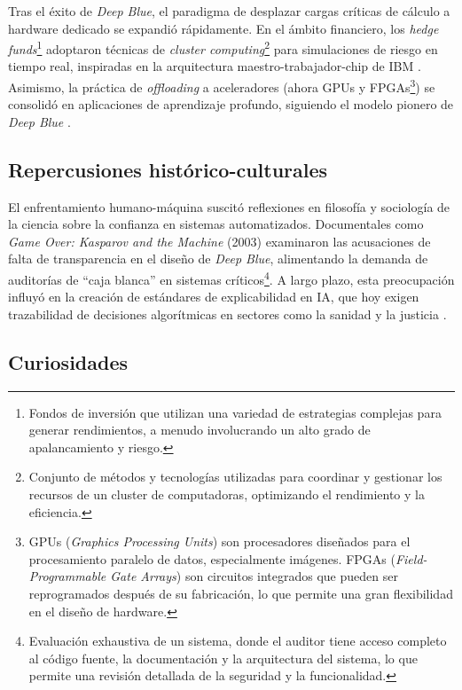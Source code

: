 \documentclass[a4paper, 12pt]{article}
\begin{document}
Tras el éxito de \textit{Deep Blue}, el paradigma de desplazar 
cargas críticas de cálculo a hardware dedicado se expandió 
rápidamente. En el ámbito financiero, los \emph{hedge funds}\footnote{Fondos de inversión que utilizan una variedad de estrategias complejas para generar rendimientos, a menudo involucrando un alto grado de apalancamiento y riesgo.} 
adoptaron técnicas de \emph{cluster computing}\footnote{Conjunto de métodos y tecnologías utilizadas para coordinar y gestionar los recursos de un cluster de computadoras, optimizando el rendimiento y la eficiencia.} 
para simulaciones de 
riesgo en tiempo real, inspiradas en la arquitectura 
maestro-trabajador-chip de IBM \cite{aung2010}. Asimismo, la práctica 
de \emph{offloading} a 
aceleradores (ahora GPUs y FPGAs\footnote{GPUs (\emph{Graphics Processing Units}) son procesadores diseñados para el procesamiento paralelo de datos, especialmente imágenes. FPGAs (\emph{Field-Programmable Gate Arrays}) son circuitos integrados que pueden ser reprogramados después de su fabricación, lo que permite una gran flexibilidad en el diseño de hardware.}) 
se consolidó en aplicaciones de 
aprendizaje profundo, siguiendo el modelo pionero de \textit{Deep 
Blue} \cite{forbes2019explainable}.

\subsection{Repercusiones histórico-culturales}

El enfrentamiento humano-máquina suscitó reflexiones en filosofía y 
sociología de la ciencia sobre la confianza en sistemas automatizados. 
Documentales como \emph{Game Over: Kasparov and the Machine} (2003) 
examinaron las acusaciones de falta de transparencia en el diseño de 
\textit{Deep Blue}, alimentando la demanda de auditorías de “caja 
blanca” en sistemas críticos\footnote{Evaluación exhaustiva de un sistema, donde el auditor tiene acceso completo al código fuente, la documentación y la arquitectura del sistema, lo que permite una revisión detallada de la seguridad y la funcionalidad.}. 
A largo plazo, 
esta preocupación influyó en la creación de estándares de 
explicabilidad en IA, que hoy exigen trazabilidad de decisiones 
algorítmicas en sectores como la sanidad y la justicia 
\cite{korf1997does,bory2019deep}.

\subsection{Curiosidades}
\end{document}
